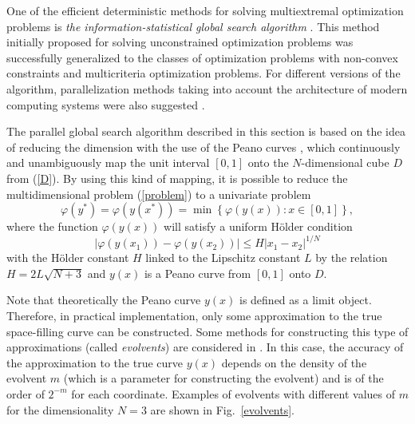\documentclass{svproc}
\begin{document}
One of the efficient deterministic methods for solving multiextremal optimization problems is \textit{the information-statistical global search algorithm} \cite{Strongin2000}. This method initially proposed for solving unconstrained optimization problems was successfully generalized to the classes of optimization problems with non-convex constraints and multicriteria optimization problems. For different versions of the algorithm, parallelization methods taking into account the architecture of modern computing systems were also suggested \cite{Barkalov2016,globalizerSystem,Strongin2018}.%

The parallel global search algorithm described in this section is based on the idea of reducing the dimension with the use of the Peano curves \cite{Sergeyev2013,Strongin2000}, which continuously and unambiguously map the unit interval $[0,1]$ onto the $N$-dimensional cube $D$ from (\ref{D}). By using this kind of mapping, it is possible to reduce the multidimensional problem (\ref{problem}) to a univariate problem
\[
\varphi(y^\ast)=\varphi(y(x^\ast))=\min{\left\{\varphi(y(x)): x\in[0,1]\right\}},
\]
where the function $\varphi(y(x))$ will satisfy a uniform H{\"o}lder condition
\[
\left|\varphi(y(x_1))-\varphi(y(x_2))\right|\leq H\left|x_1-x_2\right|^{1/N}
\]
with the H{\"o}lder constant $H$ linked to the Lipschitz constant $L$ by the relation
$ H=2 L \sqrt{N+3}$ and $y(x)$ is a Peano curve from $[0,1]$ onto $D$.

Note that theoretically the Peano curve $y(x)$ is defined as a limit object. Therefore, in practical implementation, only some approximation to the true space-filling curve can be constructed. Some methods for constructing this type of approximations (called \textit{evolvents}) are considered in \cite{Sergeyev2013,Strongin2000}. In this case, the accuracy of the approximation to the true curve $y(x)$ depends on the density of the evolvent $m$ (which is a parameter for constructing the evolvent) and is of the order of $2^{-m}$ for each coordinate.
Examples of evolvents with different values of $m$  for the dimensionality $N=3$ are shown in Fig.~\ref{evolvents}.
\end{document}
